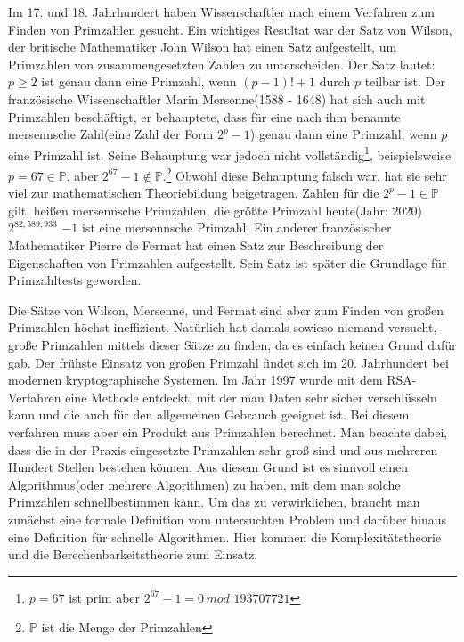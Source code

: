 \documentclass[12pt,oneside]{article}
\theoremstyle{remark}
\theoremstyle{definition}
\begin{document}
Im 17. und 18. Jahrhundert haben Wissenschaftler nach einem Verfahren zum Finden von Primzahlen gesucht. Ein wichtiges Resultat war der Satz von Wilson, der britische Mathematiker John Wilson hat einen Satz aufgestellt, um Primzahlen von zusammengesetzten Zahlen zu unterscheiden. Der Satz lautet: $p \geq 2$ ist genau dann eine Primzahl, wenn $(p - 1)! + 1$ durch $p$ teilbar ist. Der französische Wissenschaftler Marin Mersenne(1588 - 1648) hat sich auch mit Primzahlen beschäftigt, er behauptete, dass für eine nach ihm benannte mersennsche Zahl(eine Zahl der Form $2^p - 1$) genau dann eine Primzahl, wenn $p$ eine Primzahl ist. Seine Behauptung war jedoch nicht vollständig\footnote{$p = 67$ ist prim aber $2^{67} - 1 = 0 \, mod \, \, 193707721$}, beispielsweise $ p = 67 \in \mathbb{P}$, aber $2^{67} - 1 \not \in \mathbb{P}$.\footnote{$\mathbb{P}$ ist die Menge der Primzahlen} Obwohl diese Behauptung falsch war, hat sie sehr viel zur mathematischen Theoriebildung beigetragen. Zahlen für die $2^p - 1 \in \mathbb{P}$ gilt, heißen mersennsche Primzahlen, die größte Primzahl heute(Jahr: 2020) $2^{82,589,933}$ $ - 1$ ist eine mersennsche Primzahl\cite{largePrimes}. Ein anderer französischer Mathematiker Pierre de Fermat hat einen Satz zur Beschreibung der Eigenschaften von Primzahlen aufgestellt. Sein Satz ist später die Grundlage für Primzahltests geworden.
\newline

Die Sätze von Wilson, Mersenne, und Fermat sind aber zum Finden von großen Primzahlen höchst ineffizient. Natürlich hat damals sowieso niemand versucht, große Primzahlen mittels dieser Sätze zu finden, da es einfach keinen Grund dafür gab. Der frühste Einsatz von großen Primzahl findet sich im 20. Jahrhundert bei modernen kryptographische Systemen\cite{krypWiki}. Im Jahr 1997 wurde mit dem RSA-Verfahren eine Methode entdeckt, mit der man Daten sehr sicher verschlüsseln kann und die auch für den allgemeinen Gebrauch geeignet ist. Bei diesem verfahren muss aber ein Produkt aus Primzahlen berechnet\cite{rsa}. Man beachte dabei, dass die in der Praxis eingesetzte Primzahlen sehr groß sind und aus mehreren Hundert Stellen bestehen können. Aus diesem Grund ist es sinnvoll einen Algorithmus(oder mehrere Algorithmen) zu haben, mit dem man solche Primzahlen \textquotedbl schnell\textquotedbl bestimmen kann. Um das zu verwirklichen, braucht man zunächst eine formale Definition vom untersuchten Problem und darüber hinaus eine Definition für schnelle Algorithmen. Hier kommen die Komplexitätstheorie und die Berechenbarkeitstheorie zum Einsatz. 
\end{document}
